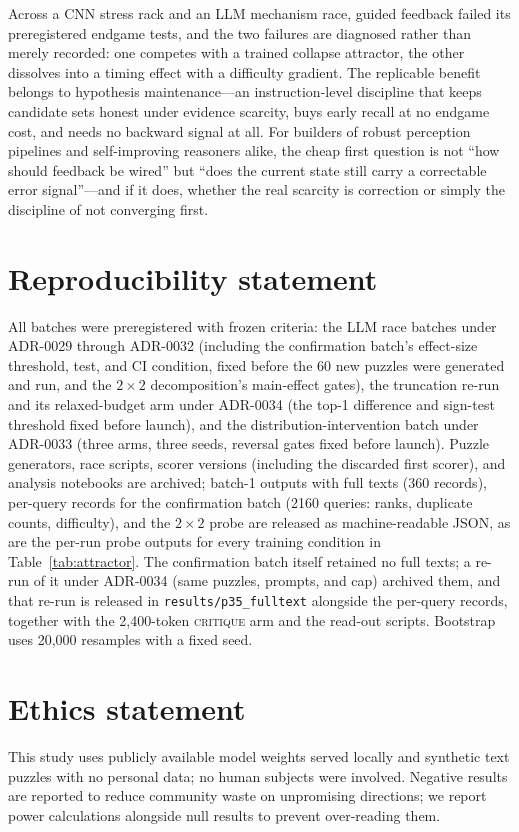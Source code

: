 \documentclass[10pt]{article}
\newcommand{\Mcrit}{\textsc{critique}}
\begin{document}
Across a CNN stress rack and an LLM mechanism race, guided feedback
failed its preregistered endgame tests, and the two failures are
diagnosed rather than merely recorded: one competes with a trained
collapse attractor, the other dissolves into a timing effect with a
difficulty gradient. The replicable benefit belongs to hypothesis
maintenance---an instruction-level discipline that keeps candidate sets
honest under evidence scarcity, buys early recall at no endgame cost,
and needs no backward signal at all. For builders of robust perception
pipelines and self-improving reasoners alike, the cheap first question
is not ``how should feedback be wired'' but ``does the current state
still carry a correctable error signal''---and if it does, whether the
real scarcity is correction or simply the discipline of not
converging first.

\section*{Reproducibility statement}
All batches were preregistered with frozen criteria: the LLM race batches
under ADR-0029 through ADR-0032 (including the confirmation batch's
effect-size threshold, test, and CI condition, fixed before the 60 new
puzzles were generated and run, and the $2\times2$ decomposition's
main-effect gates), the truncation re-run and its relaxed-budget arm
under ADR-0034 (the top-1 difference and sign-test threshold fixed
before launch), and the distribution-intervention batch under
ADR-0033 (three arms, three seeds, reversal gates fixed before launch).
Puzzle generators, race scripts, scorer versions (including the
discarded first scorer), and analysis
notebooks are archived; batch-1 outputs with full texts (360 records),
per-query records for the confirmation batch (2160 queries: ranks,
duplicate counts, difficulty), and the $2\times2$ probe are
released as machine-readable JSON, as are the per-run probe
outputs for every training condition in Table~\ref{tab:attractor}.
The confirmation batch itself retained no full texts; a re-run of it
under ADR-0034 (same puzzles, prompts, and cap) archived them, and that
re-run is released in \texttt{results/p35\_fulltext} alongside the
per-query records, together with the 2{,}400-token \Mcrit{} arm and the
read-out scripts.
Bootstrap uses 20{,}000 resamples with a fixed seed.

\section*{Ethics statement}
This study uses publicly available model weights served locally and
synthetic text puzzles with no personal data; no human subjects were
involved. Negative results are reported to reduce community waste on
unpromising directions; we report power calculations alongside null
results to prevent over-reading them.
\end{document}
